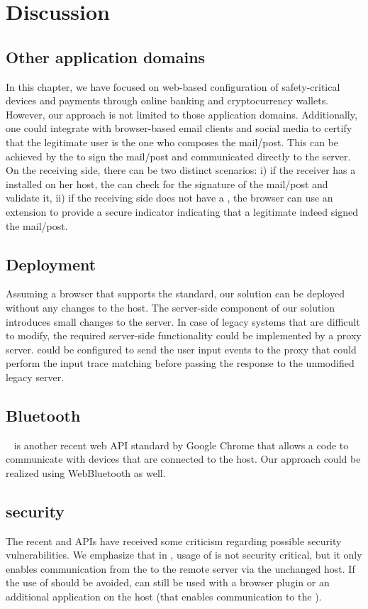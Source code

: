\section{Discussion}
\label{sec:discussion_IK}

\subsection{Other application domains} In this chapter, we have focused on web-based configuration of safety-critical devices and payments through online banking and cryptocurrency wallets. However, our approach is not limited to those application domains. Additionally, one could integrate \name with browser-based email clients and social media to certify that the legitimate user is the one who composes the mail/post. This can be achieved by the \device to sign the mail/post and communicated directly to the server. On the receiving side, there can be two distinct scenarios: i) if the receiver has a \device installed on her host, the \device can check for the signature of the mail/post and validate it, ii) if the receiving side does not have a \device, the browser can use an extension to provide a secure indicator indicating that a legitimate \device indeed signed the mail/post.

\subsection{Deployment} Assuming a browser that supports the \webusb standard, our solution can be deployed without any changes to the host. The server-side component of our solution introduces small changes to the server. In case of legacy systems that are difficult to modify, the required server-side functionality could be implemented by a proxy server. \device could be configured to send the user input events to the proxy that could perform the input trace matching before passing the response to the unmodified legacy server. 

\subsection{Bluetooth} \webbt~\cite{webbt} is another recent web API standard by Google Chrome that allows a \js code to communicate with devices that are connected to the host. Our approach could be realized using WebBluetooth as well.

\subsection{\webusb security} The recent \webusb and \webbt APIs have received some criticism regarding possible security vulnerabilities. We emphasize that in \name, usage of \webusb is not security critical, but it only enables communication from the \device to the remote server via the unchanged host. If the use of \webusb should be avoided, \name can still be used with a browser plugin or an additional application on the host (that enables communication to the \device).

